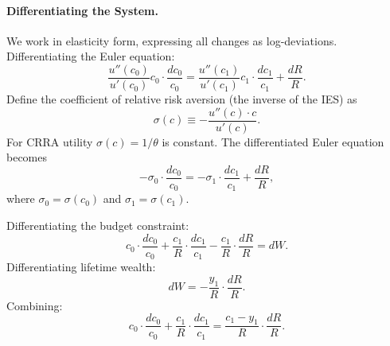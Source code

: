 \paragraph{Differentiating the System.}
We work in elasticity form, expressing all changes as log-deviations. Differentiating the Euler equation:
\begin{equation}
\frac{u''(c_0)}{u'(c_0)} c_0 \cdot \frac{dc_0}{c_0} = \frac{u''(c_1)}{u'(c_1)} c_1 \cdot \frac{dc_1}{c_1} + \frac{dR}{R}.
\label{eq:euler-diff}
\end{equation}
Define the coefficient of relative risk aversion (the inverse of the IES) as
\begin{equation}
\sigma(c) \equiv -\frac{u''(c) \cdot c}{u'(c)}.
\label{eq:rra-def}
\end{equation}
For CRRA utility $\sigma(c) = 1/\theta$ is constant. The differentiated Euler equation becomes
\begin{equation}
-\sigma_0 \cdot \frac{dc_0}{c_0} = -\sigma_1 \cdot \frac{dc_1}{c_1} + \frac{dR}{R},
\label{eq:euler-diff-sigma}
\end{equation}
where $\sigma_0 = \sigma(c_0)$ and $\sigma_1 = \sigma(c_1)$.

Differentiating the budget constraint:
\begin{equation}
c_0 \cdot \frac{dc_0}{c_0} + \frac{c_1}{R} \cdot \frac{dc_1}{c_1} - \frac{c_1}{R} \cdot \frac{dR}{R} = dW.
\label{eq:budget-diff}
\end{equation}
Differentiating lifetime wealth:
\begin{equation}
dW = -\frac{y_1}{R} \cdot \frac{dR}{R}.
\label{eq:wealth-diff}
\end{equation}
Combining:
\begin{equation}
c_0 \cdot \frac{dc_0}{c_0} + \frac{c_1}{R} \cdot \frac{dc_1}{c_1} = \frac{c_1 - y_1}{R} \cdot \frac{dR}{R}.
\label{eq:budget-combined}
\end{equation}


